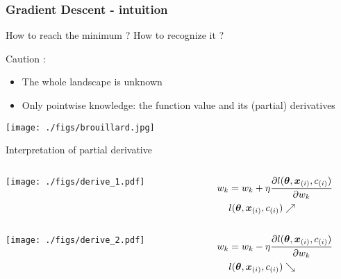 \begin{frame}
  \frametitle{Gradient Descent - intuition}
  How to reach the minimum ? How to recognize it ?

  \begin{alertblock}{Caution :}
    \begin{itemize}
    \item The whole landscape is unknown
    \item Only pointwise knowledge: the function value and its
      (partial) derivatives
    \end{itemize}
  \end{alertblock}
  \begin{center}
    \texttt{[image: ./figs/brouillard.jpg]}
  \end{center} 
\end{frame}


\begin{frame}{Interpretation of partial derivative}
  \begin{columns}
    \begin{column}{0.5\textwidth}
      \texttt{[image: ./figs/derive\_1.pdf]}
    \end{column}
    \begin{column}{0.5\textwidth}
      \begin{align*}
        w_k &= w_k + \eta \frac{\partial l(\boldsymbol{\theta},\boldsymbol{x}_{(i)},{c}_{(i)}) }{\partial
          w_k}\ \\
        &l(\boldsymbol{\theta},\boldsymbol{x}_{(i)},{c}_{(i)}) \nearrow
      \end{align*}
    \end{column}
  \end{columns}
  \begin{columns}
    \begin{column}{0.5\textwidth}
      \texttt{[image: ./figs/derive\_2.pdf]}
    \end{column}
    \begin{column}{0.5\textwidth}
      \begin{align*}
        w_k &= w_k - \eta \frac{\partial l(\boldsymbol{\theta},\boldsymbol{x}_{(i)},{c}_{(i)})}{\partial
          w_k}\ \\
         &l(\boldsymbol{\theta},\boldsymbol{x}_{(i)},{c}_{(i)}) \searrow
      \end{align*}
\end{column}
  \end{columns}
  \begin{center}
  \end{center}
\end{frame}


